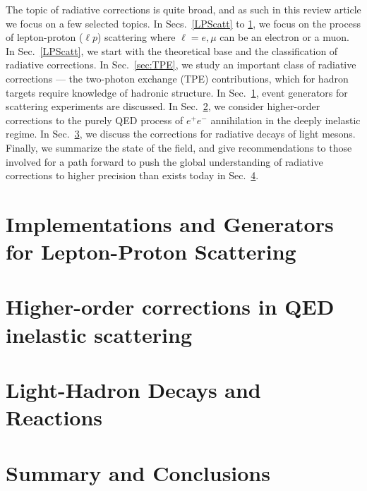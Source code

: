 \documentclass[pdflatex,sn-mathphys,Numbered,iicol]{sn-jnl}
\begin{document}
The topic of radiative corrections is quite broad, and as such in this review article we focus on a few selected topics. In Secs.~\ref{LPScatt} to \ref{sec:Implementations}, we focus on the process of lepton-proton ($\ell p$) scattering where $\ell=e,\mu$ can be an electron or a muon. In Sec.~\ref{LPScatt}, we start with the theoretical base and the classification of radiative corrections. In Sec.~\ref{sec:TPE}, we study an important class of radiative corrections --- the two-photon exchange (TPE) contributions, which for hadron targets require knowledge of hadronic structure. In Sec.~\ref{sec:Implementations}, event generators for scattering experiments are discussed. In Sec.~\ref{sec:ho}, we consider higher-order corrections to the purely QED process of $e^+e^-$ annihilation in the deeply inelastic regime. In Sec.~\ref{sec:mesons}, we discuss the corrections for radiative decays of light mesons. Finally, we summarize the state of the field, and give recommendations to those involved for a path forward to push the global understanding of radiative corrections to higher precision than exists today in Sec.~\ref{sec:Summary}.



 


 
 


\section{Implementations and Generators for Lepton-Proton Scattering}\label{sec:Implementations}


\section{Higher-order corrections in QED inelastic scattering}\label{sec:ho}




\section{Light-Hadron Decays and Reactions}\label{sec:mesons}


\section{Summary and Conclusions}\label{sec:Summary}
\end{document}
